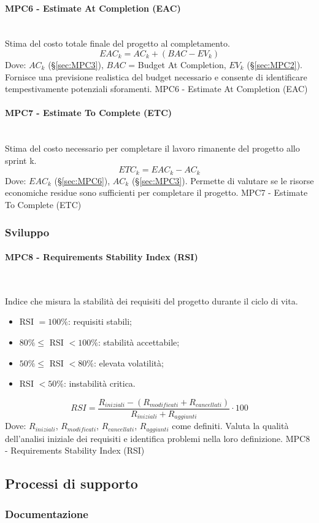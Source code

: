 \documentclass[10pt, letterpaper]{article}
\newcommand{\trisubsection}[1]{\paragraph{#1}\mbox{}\\}
\begin{document}
\trisubsection{MPC6 - Estimate At Completion (EAC)}
\label{sec:MPC6}
{Stima del costo totale finale del progetto al completamento.}
{\[EAC_k = AC_k + (BAC - EV_k) \]
    Dove: $AC_k$ (§\ref{sec:MPC3}), $BAC$ = Budget At Completion, $EV_k$ (§\ref{sec:MPC2}).
}
{Fornisce una previsione realistica del budget necessario e consente di identificare tempestivamente potenziali sforamenti.}
{MPC6 - Estimate At Completion (EAC)}

\trisubsection{MPC7 - Estimate To Complete (ETC)}
\label{sec:MPC7}
{Stima del costo necessario per completare il lavoro rimanente del progetto allo sprint k.}
{\[ ETC_k = EAC_k - AC_k \]
    Dove: $EAC_k$ (§\ref{sec:MPC6}), $AC_k$ (§\ref{sec:MPC3}).
}
{Permette di valutare se le risorse economiche residue sono sufficienti per completare il progetto.}
{MPC7 - Estimate To Complete (ETC)}

\subsubsection{Sviluppo}

\trisubsection{MPC8 - Requirements Stability Index (RSI)}
\label{sec:MPC8}
{Indice che misura la stabilità dei requisiti del progetto durante il ciclo di vita.
    \begin{itemize}
        \item RSI $= 100\%$: requisiti stabili;
        \item $80\% \leq$ RSI $< 100\%$: stabilità accettabile;
        \item $50\% \leq$ RSI $< 80\%$: elevata volatilità;
        \item RSI $< 50\%$: instabilità critica.
    \end{itemize}}
{\[RSI = \frac{R_{iniziali} - (R_{modificati} + R_{cancellati})}{R_{iniziali} + R_{aggiunti}} \cdot 100\]
    Dove: $R_{iniziali}$, $R_{modificati}$, $R_{cancellati}$, $R_{aggiunti}$ come definiti.
}
{Valuta la qualità dell'analisi iniziale dei requisiti e identifica problemi nella loro definizione.}
{MPC8 - Requirements Stability Index (RSI)}

\subsection{Processi di supporto}
\subsubsection{Documentazione}
\end{document}
